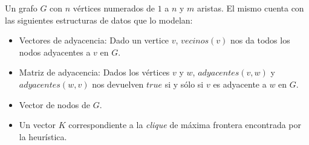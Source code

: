 \begin{pseudocodigo}
    \Require Un grafo $G$ con $n$ v\'ertices numerados de $1$ a $n$ y $m$ aristas. El mismo
        cuenta con las siguientes estructuras de datos que lo modelan:
        \begin{itemize}
            \item Vectores de adyacencia: Dado un vertice $v$, $vecinos(v)$ nos da todos los
                nodos adyacentes a $v$ en $G$.

            \item Matriz de adyacencia: Dados los v\'ertices $v$ y $w$, $adyacentes(v,w)$ y
                $adyacentes(w,v)$ nos devuelven $true$ si y s\'olo si $v$ es adyacente
                a $w$ en $G$.

            \item Vector de nodos de $G$.
        \end{itemize}
    \Ensure\Statex
        \begin{itemize}
            \item Un vector $K$ correspondiente a la \emph{clique} de m\'axima frontera
                encontrada por la heur\'istica.


\end{itemize}
\end{pseudocodigo}
